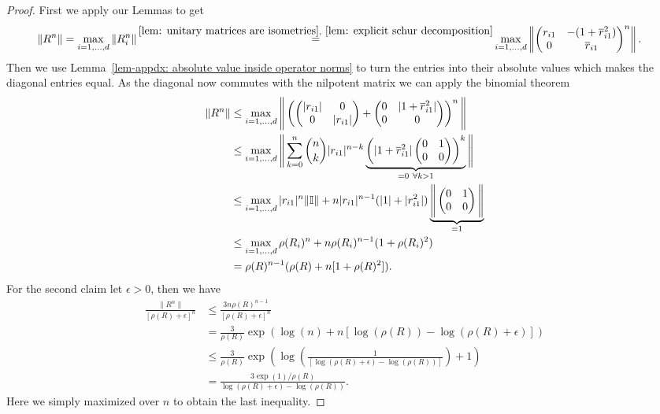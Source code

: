 \begin{proof}
	First we apply our Lemmas to get
	\begin{align*}
		\|R^n\|
		&=\max_{i=1,\dots,\dimension}	\|R_i^n\|
		\xeq{\ref{lem: unitary matrices are isometries},\ \ref{lem: explicit schur decomposition}}
		\max_{i=1,\dots,\dimension}\left\|\begin{pmatrix}
			r_{i1} & -(1+\conjugate{r}_{i1}^2)\\
			0 & \conjugate{r}_{i1}
		\end{pmatrix}^n\right\|.
	\end{align*}
	Then we use Lemma~\ref{lem-appdx: absolute value inside operator norms} to
	turn the entries into their absolute values which makes the diagonal entries
	equal. As the diagonal now commutes with the nilpotent matrix we can apply the
	binomial theorem 
	\begin{align*}
		\|R^n\|
		&\le \max_{i=1,\dots,d}
		\Bigg\|\left(
		\begin{pmatrix}
			|r_{i1}| & 0\\
			0 & |r_{i1}|
		\end{pmatrix}
		+ \begin{pmatrix}
			0 & |1+\overline{r}_{i1}^2|\\
			0 & 0
		\end{pmatrix}
		\right)^n\Bigg\|\\
		&\le \max_{i=1,\dots,d}
		\Bigg\|
		\sum_{k=0}^n {n \choose k}
				|r_{i1}|^{n-k}
			\underbrace{
				\left(
				|1+\overline{r}_{i1}^2|
				\begin{pmatrix}
					0 & 1\\
					0 & 0
				\end{pmatrix}
				\right)^k
			}_{=0 \ \forall k>1}
		\Bigg\|\\
		&\le \max_{i=1,\dots,d}
		|r_{i1}|^n \|\mathbb{I}\| + n |r_{i1}|^{n-1}(|1|+|r_{i1}^2|)
		\underbrace{
			\Bigg\|
				\begin{pmatrix}
					0 & 1\\
					0 & 0
				\end{pmatrix}
			\Bigg\|
		}_{=1}
		\\
		&\le \max_{i=1,\dots,d}
		\rho(R_i)^n + n \rho(R_i)^{n-1}(1+\rho(R_i)^2)\\
		&=	\rho(R)^{n-1}(\rho(R) + n [1+\rho(R)^2]).
	\end{align*}
	For the second claim let \(\epsilon>0\), then we have
	\begin{align*}
		\frac{\|R^n\|}{[\rho(R)+\epsilon]^n}
		&\le \frac{3n\rho(R)^{n-1}}{[\rho(R)+\epsilon]^n}\\
		&= \frac{3}{\rho(R)}\exp(\log(n) + n[\log(\rho(R))-\log(\rho(R)+\epsilon)])\\
		&\le \frac{3}{\rho(R)}\exp
		\left(\log\left(\frac{1}{[\log(\rho(R)+\epsilon)-\log(\rho(R))]}\right) + 1\right)\\
		&= \frac{3\exp(1)/\rho(R)}{\log(\rho(R)+\epsilon)-\log(\rho(R))}.
	\end{align*}
	Here we simply maximized over \(n\) to obtain the last inequality.
\end{proof}



